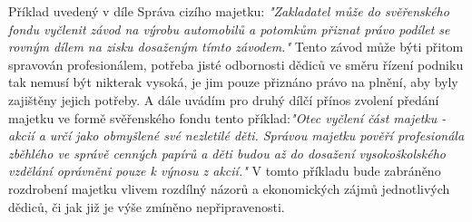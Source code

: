 \documentclass{article}
\begin{document}
 
 
 Příklad uvedený v díle Správa cizího majetku: \textit{"Zakladatel může  do svěřenského fondu vyčlenit závod na výrobu automobilů a potomkům přiznat právo podílet se rovným dílem na zisku dosaženým tímto závodem."} Tento závod může býti přitom spravován profesionálem, potřeba jisté odbornosti dědiců ve směru řízení podniku tak nemusí být nikterak vysoká, je jim pouze přiznáno právo na plnění, aby byly zajištěny jejich potřeby. A dále uvádím pro druhý dílčí přínos zvolení předání majetku ve formě svěřenského fondu tento příklad:\textit{"Otec vyčlení část majetku - akcií a určí jako obmyšlené své nezletilé děti. Správou majetku pověří profesionála zběhlého ve správě cenných papírů a děti budou až do dosažení vysokoškolského vzdělání oprávněni pouze k výnosu z akcií."} V tomto příkladu bude zabráněno rozdrobení majetku vlivem rozdílný názorů a ekonomických zájmů jednotlivých dědiců, či jak již je výše zmíněno nepřipravenosti.\\
 
 
 
\end{document}
